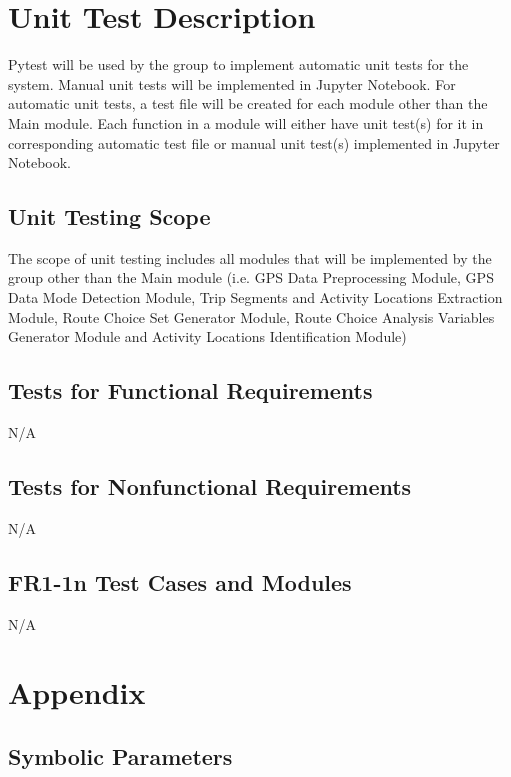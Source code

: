 \documentclass[12pt, titlepage]{article}
\begin{document}
\section{Unit Test Description}
\label{section:6}
Pytest will be used by the group to implement automatic unit tests for the system. Manual unit tests will be implemented in Jupyter Notebook. For automatic unit tests, a test file will be created for each module other than the Main module. Each function in a module will either have unit test(s) for it in corresponding automatic test file or manual unit test(s) implemented in Jupyter Notebook. 

\subsection{Unit Testing Scope}
The scope of unit testing includes all modules that will be implemented by the group other than the Main module (i.e. GPS Data Preprocessing Module, GPS Data Mode Detection Module, Trip Segments and Activity Locations Extraction Module, Route Choice Set Generator Module, Route Choice Analysis Variables Generator Module and Activity Locations Identification Module)

\subsection{Tests for Functional Requirements}

N/A

\subsection{Tests for Nonfunctional Requirements}

N/A


\subsection{FR1-1n Test Cases and Modules}

N/A
				


% 


\newpage

\section{Appendix}

\subsection{Symbolic Parameters}
\end{document}
